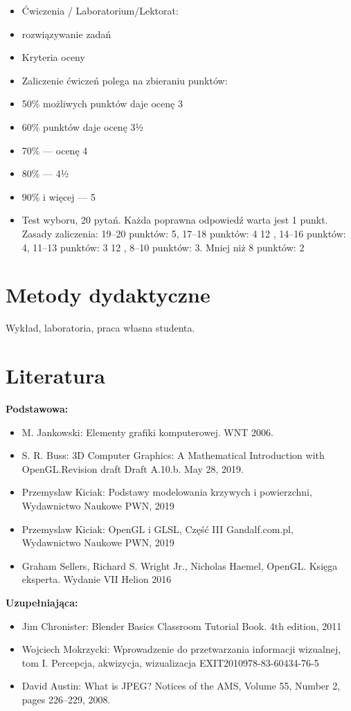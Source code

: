 \documentclass[12pt, a4paper]{article}
\begin{document}
\begin{itemize}
  \item Ćwiczenia / Laboratorium/Lektorat:
  \item rozwiązywanie zadań
  \item Kryteria oceny
  \item Zaliczenie ćwiczeń polega na zbieraniu punktów:
  \item 50\% możliwych punktów daje ocenę 3
  \item 60\% punktów daje ocenę 3½
  \item 70\% — ocenę 4
  \item 80\% — 4½
  \item 90\% i więcej — 5
  \item Test wyboru, 20 pytań. Każda poprawna odpowiedź warta jest 1 punkt. Zasady zaliczenia: 19–20 punktów: 5, 17–18 punktów: 4 12 , 14–16 punktów: 4, 11–13 punktów: 3 12 , 8–10 punktów: 3. Mniej niż 8 punktów: 2
\end{itemize}

\section{Metody dydaktyczne}

Wykład, laboratoria, praca własna studenta.

\section{Literatura}

\textbf{Podstawowa:}
\begin{itemize}
  \item M. Jankowski: Elementy grafiki komputerowej. WNT 2006.
  \item S. R. Buss: 3D Computer Graphics: A Mathematical Introduction with OpenGL.Revision draft Draft A.10.b. May 28, 2019.
  \item Przemyslaw Kiciak: Podstawy modelowania krzywych i powierzchni, Wydawnictwo Naukowe PWN, 2019
  \item Przemyslaw Kiciak: OpenGL i GLSL, Część III Gandalf.com.pl, Wydawnictwo Naukowe PWN, 2019
  \item Graham Sellers, Richard S. Wright Jr., Nicholas Haemel, OpenGL. Księga eksperta. Wydanie VII Helion 2016
\end{itemize}

\textbf{Uzupełniająca:}
\begin{itemize}
  \item Jim Chronister: Blender Basics Classroom Tutorial Book. 4th edition, 2011
  \item Wojciech Mokrzycki: Wprowadzenie do przetwarzania informacji wizualnej, tom I. Percepcja, akwizycja, wizualizacja EXIT2010978-83-60434-76-5
  \item David Austin: What is JPEG? Notices of the AMS, Volume 55, Number 2, pages 226–229, 2008.
\end{itemize}
\end{document}
